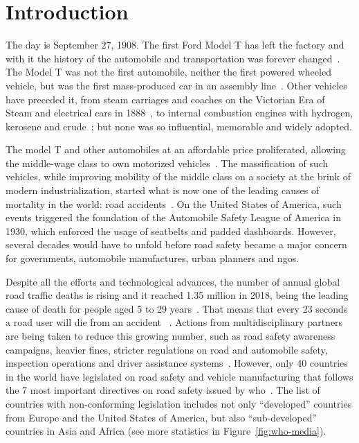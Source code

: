 \chapter{Introduction}
\label{chapter:introduction}

The day is September 27, 1908. The first Ford Model T has left the factory and with it the history of the automobile and transportation was forever changed~\cite{Ford, JohnSteeleGordon2007}. The Model T was not the first automobile, neither the first powered wheeled vehicle, but was the first mass-produced car in an assembly line~\cite{JohnSteeleGordon2007, DailyNews2013}. Other vehicles have preceded it, from steam carriages and coaches on the Victorian Era of Steam and electrical cars in 1888~\cite{PaulA.Hughes}, to internal combustion engines with hydrogen, kerosene and crude~\cite{Setright2003}; but none was so influential, memorable and widely adopted. 

The model T and other automobiles at an affordable price proliferated, allowing the middle-wage class to own motorized vehicles~\cite{JohnSteeleGordon2007, DailyNews2013}. The massification of such vehicles, while improving mobility of the middle class on a society at the brink of modern industrialization, started what is now one of the leading causes of mortality in the world: road accidents~\cite{WHO2018}. On the United States of America, such events triggered the foundation of the Automobile Safety League of America in 1930, which enforced the usage of seatbelts and padded dashboards. However, several decades would have to unfold before road safety became a major concern for governments, automobile manufactures, urban planners and \acp{ngo}. 

Despite all the efforts and technological advances, the number of annual global road traffic deaths is rising and it reached 1.35 million in 2018, being the leading cause of death for people aged 5 to 29 years~\cite{WHO2018}. That means that every 23 seconds a road user will die from an accident%
~\cite{WHOvisualizer}. Actions from multidisciplinary partners are being taken to reduce this growing number, such as road safety awareness campaigns, heavier fines, stricter regulations on road and automobile safety, inspection operations and driver assistance systems~\cite{WHO2018, EUroads}. However, only 40 countries in the world have legislated on road safety and vehicle manufacturing that follows the 7 most important directives on road safety issued by \acf{who}~\cite{WHOvisualizer}. The list of countries with non-conforming legislation includes not only ``developed'' countries from Europe and the United States of America, but also ``sub-developed'' countries in Asia and Africa (see more statistics in Figure~\ref{fig:who-media}).

